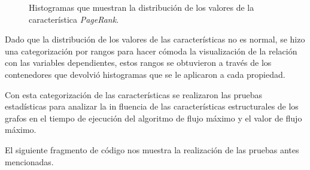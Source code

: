 \documentclass{article}
\begin{document}
\begin{figure}[htbp]

\caption{Histogramas que muestran la distribución de los valores de la característica \textit{PageRank}. }
\label{fig12} 
\end{figure}
Dado que la distribución de los valores de las características no es normal, se hizo una categorización por rangos para hacer cómoda la visualización de la relación con las variables dependientes, estos rangos se obtuvieron a través de los contenedores que devolvió histogramas que se le aplicaron a cada propiedad.

Con esta categorización de las características se realizaron las pruebas estadísticas para analizar la in fluencia de las características estructurales de los grafos en el tiempo de ejecución del algoritmo de flujo máximo y el valor de flujo máximo.

El siguiente fragmento de código nos muestra la realización de las pruebas antes mencionadas.

 
\begin{center}

\end{center}
\newpage
\end{document}

